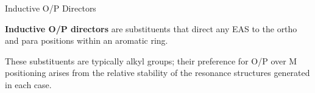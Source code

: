       \begin{core}{Inductive O/P Directors}

        \textbf{Inductive O/P directors} are substituents that direct any EAS to the ortho and para positions within an aromatic ring.


        These substituents are typically alkyl groups; their preference for O/P over M positioning arises from the relative stability of the resonance structures generated in each case.


\end{core}

